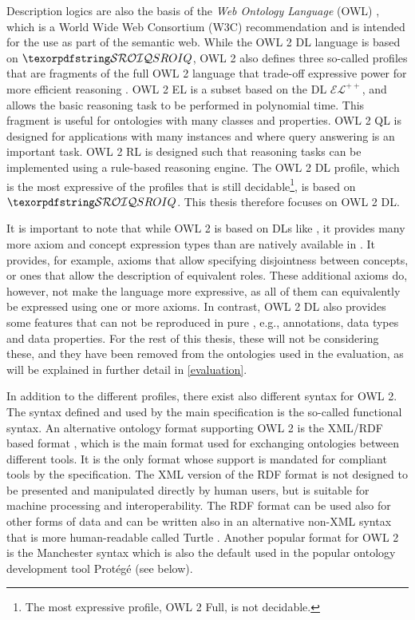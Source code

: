 
Description logics are also the basis of the \emph{Web Ontology Language} (OWL) \cite{hitzler2012primer,motik2012ontology}, which is a World Wide Web Consortium (W3C) recommendation and is intended for the use as part of the semantic web. While the OWL 2 DL language is based on $\SROIQ$, OWL 2 also defines three so-called profiles that are fragments of the full OWL 2 language that trade-off expressive power for more efficient reasoning \cite{motik2012profiles,motik2012ontology}. OWL 2 EL is a subset based on the DL $\mathcal{EL}^{++}$, and allows the basic reasoning task to be performed in polynomial time. This fragment is useful for ontologies with many classes and properties. OWL 2 QL is designed for applications with many instances and where query answering is an important task. OWL 2 RL is designed such that reasoning tasks can be implemented using a rule-based reasoning engine. The OWL 2 DL profile, which is the most expressive of the profiles that is still decidable\footnote{The most expressive profile, OWL 2 Full, is not decidable.}, is based on $\SROIQ$. This thesis therefore focuses on OWL 2 DL.

It is important to note that while OWL 2 is based on DLs like \SROIQ, it provides many more axiom and concept expression types than are natively available in \SROIQ. It provides, for example, axioms that allow specifying disjointness between concepts, or ones that allow the description of equivalent roles. These additional axioms do, however, not make the language more expressive, as all of them can equivalently be expressed using one or more \SROIQ axioms. In contrast, OWL 2 DL also provides some features that can not be reproduced in pure \SROIQ, e.g., annotations, data types and data properties. For the rest of this thesis, these will not be considering these, and they have been removed from the ontologies used in the evaluation, as will be explained in further detail in \cref{evaluation}.

In addition to the different profiles, there exist also different syntax for OWL 2. The syntax defined and used by the main specification \cite{motik2012ontology} is the so-called functional syntax. An alternative ontology format supporting OWL 2 is the XML/RDF based format \cite{beckett2004rdf,motik2009rdf}, which is the main format used for exchanging ontologies between different tools. It is the only format whose support is mandated for compliant tools by the specification. The XML version of the RDF format is not designed to be presented and manipulated directly by human users, but is suitable for machine processing and interoperability. The RDF format can be used also for other forms of data and can be written also in an alternative non-XML syntax that is more human-readable called Turtle \cite{beckett2008turtle}. Another popular format for OWL 2 is the Manchester syntax \cite{horridge2009manchester} which is also the default used in the popular ontology development tool Protégé (see below).

